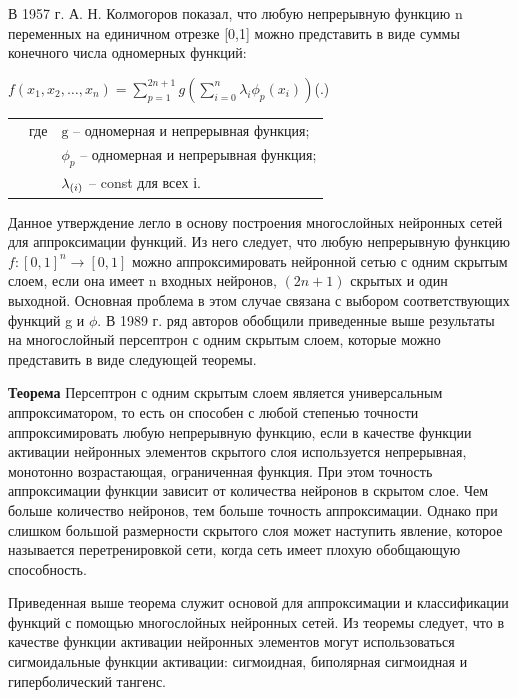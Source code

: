 	\par \redline В 1957 г. А. Н. Колмогоров показал, что любую непрерывную функцию \textrm{n} переменных на единичном отрезке \textrm{[0,1]} можно представить в виде суммы конечного числа одномерных функций: 
	
	\formulaspace \par \redline 
	$\mathit{f}(x_1,x_2,\dots,x_n) = \sum \limits _{p=1}^{2n+1} g( \sum \limits _{i=0}^{n} \lambda_{i} \phi_{p}(x_{i}))$\hfill (\thechaptercntr .\theformulacntr) \redline
	\formulaspace \addtocounter{formulacntr}{1}
	 
	
	\begin{tabular}{p{}p{}p{}}
		& где  & $\textrm{g}$ {--} одномерная и непрерывная функция; \\
		&      & $\phi_{p}$ {--} одномерная и непрерывная функция; \\
		&      & $\lambda_{\textrm(i)}$ {--} const для всех і. \\
		\end{tabular}
	
	\par \redline Данное утверждение легло в основу построения многослойных нейронных сетей для аппроксимации функций. Из него следует, что любую непрерывную функцию $\mathit{f}:[0,1]^{n} \rightarrow [0,1] $  можно аппроксимировать нейронной сетью с одним скрытым слоем, если она имеет n входных нейронов, $(2n + 1)$ скрытых и один выходной. Основная проблема в этом случае связана с выбором соответствующих функций g и $\phi$. В 1989 г. ряд авторов обобщили приведенные выше результаты на многослойный персептрон с одним скрытым слоем, которые можно представить в виде следующей теоремы.
	
	\par \redline \textbf{Теорема} Персептрон с одним скрытым слоем является универсальным аппроксиматором, то есть он способен с любой степенью точности аппроксимировать любую непрерывную функцию, если в качестве функции активации нейронных элементов скрытого слоя используется непрерывная, монотонно возрастающая, ограниченная функция. При этом точность аппроксимации функции зависит от количества нейронов в скрытом слое. Чем больше количество нейронов, тем больше точность аппроксимации. Однако при слишком большой размерности скрытого слоя может наступить явление, которое называется перетренировкой сети, когда сеть имеет плохую обобщающую способность.
	
	\par \redline Приведенная выше теорема служит основой для аппроксимации и классификации функций с помощью многослойных нейронных сетей. Из теоремы следует, что в качестве функции активации нейронных элементов могут использоваться сигмоидальные функции активации: сигмоидная, биполярная сигмоидная и гиперболический тангенс.
	
